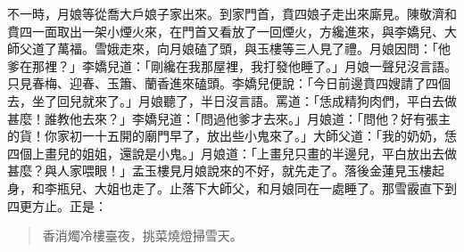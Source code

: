 不一時，月娘等從喬大戶娘子家出來。到家門首，賁四娘子走出來廝見。陳敬濟和賁四一面取出一架小煙火來，在門首又看放了一回煙火，方纔進來，與李嬌兒、大師父道了萬福。雪娥走來，向月娘磕了頭，與玉樓等三人見了禮。月娘因問：「他爹在那裡？」李嬌兒道：「剛纔在我那屋裡，我打發他睡了。」月娘一聲兒沒言語。只見春梅、迎春、玉簫、蘭香進來磕頭。李嬌兒便說：「今日前邊賁四嫂請了四個去，坐了回兒就來了。」月娘聽了，半日沒言語。罵道：「恁成精狗肉們，平白去做甚麼！誰教他去來？」李嬌兒道：「問過他爹才去來。」月娘道：「問他？好有張主的貨！你家初一十五開的廟門早了，放出些小鬼來了。」大師父道：「我的奶奶，恁四個上畫兒的姐姐，還說是小鬼。」月娘道：「上畫兒只畫的半邊兒，平白放出去做甚麼？與人家喂眼！」孟玉樓見月娘說來的不好，就先走了。落後金蓮見玉樓起身，和李瓶兒、大姐也走了。止落下大師父，和月娘同在一處睡了。那雪霰直下到四更方止。正是：
\begin{quote}
香消燭冷樓臺夜，挑菜燒燈掃雪天。
\end{quote}


